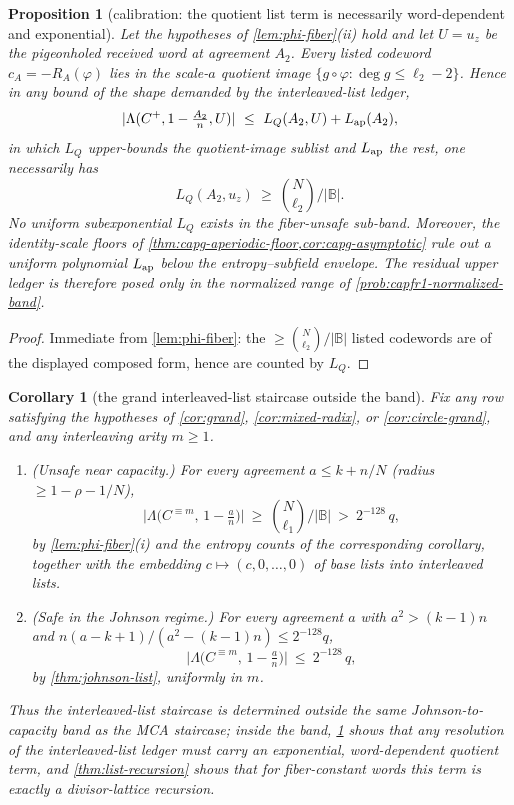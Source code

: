 \documentclass[11pt]{article}
\newtheorem{proposition}[proposition]{Proposition}
\newtheorem{corollary}[corollary]{Corollary}
\theoremstyle{definition}
\theoremstyle{remark}
\newcommand{\B}{\mathbb{B}}
\newcommand{\Lst}{\Lambda}
\begin{document}
\begin{proposition}[calibration: the quotient list term is necessarily word-dependent and exponential]\label{prop:list-calibration}
Let the hypotheses of \cref{lem:phi-fiber}\textup{(ii)} hold and let $U=u_z$ be the pigeonholed received word at agreement $A_2$. Every listed codeword $c_A=-R_A(\varphi)$ lies in the scale-$a$ quotient image $\{g\circ\varphi:\deg g\le\ell_2-2\}$. Hence in any bound of the shape demanded by the interleaved-list ledger,
\[
|\Lst(C^+,1-\tfrac{A_2}n,U)|\ \le\ L_Q(A_2,U)+L_{\rm ap}(A_2),
\]
in which $L_Q$ upper-bounds the quotient-image sublist and $L_{\rm ap}$ the rest, one necessarily has
\[
L_Q(A_2,u_z)\ \ge\ \binom N{\ell_2}\Big/|\B| .
\]
No uniform subexponential $L_Q$ exists in the fiber-unsafe sub-band.  Moreover, the identity-scale floors of \cref{thm:capg-aperiodic-floor,cor:capg-asymptotic} rule out a uniform polynomial $L_{\rm ap}$ below the entropy--subfield envelope.  The residual upper ledger is therefore posed only in the normalized range of \cref{prob:capfr1-normalized-band}.
\end{proposition}

\begin{proof}
Immediate from \cref{lem:phi-fiber}: the $\ge\binom N{\ell_2}/|\B|$ listed codewords are of the displayed composed form, hence are counted by $L_Q$.
\end{proof}

\begin{corollary}[the grand interleaved-list staircase outside the band]\label{cor:list-sandwich}
Fix any row satisfying the hypotheses of \cref{cor:grand}, \cref{cor:mixed-radix}, or \cref{cor:circle-grand}, and any interleaving arity $m\ge1$.
\begin{enumerate}[label=\textup{(\roman*)}]
\item \textup{(Unsafe near capacity.)} For every agreement $a\le k+n/N$ \textup(radius $\ge1-\rho-1/N$\textup),
\[
\bigl|\Lst\bigl(C^{\equiv m},\,1-\tfrac an\bigr)\bigr|\ \ge\ \binom N{\ell_1}\Big/|\B|\ >\ 2^{-128}\,q ,
\]
by \cref{lem:phi-fiber}\textup{(i)} and the entropy counts of the corresponding corollary, together with the embedding $c\mapsto(c,0,\dots,0)$ of base lists into interleaved lists.
\item \textup{(Safe in the Johnson regime.)} For every agreement $a$ with $a^2>(k-1)n$ and $n(a-k+1)/(a^2-(k-1)n)\le2^{-128}q$,
\[
\bigl|\Lst\bigl(C^{\equiv m},\,1-\tfrac an\bigr)\bigr|\ \le\ 2^{-128}\,q ,
\]
by \cref{thm:johnson-list}, uniformly in $m$.
\end{enumerate}
Thus the interleaved-list staircase is determined outside the same Johnson-to-capacity band as the MCA staircase; inside the band, \cref{prop:list-calibration} shows that any resolution of the interleaved-list ledger must carry an exponential, word-dependent quotient term, and \cref{thm:list-recursion} shows that for fiber-constant words this term is exactly a divisor-lattice recursion.
\end{corollary}
\end{document}
